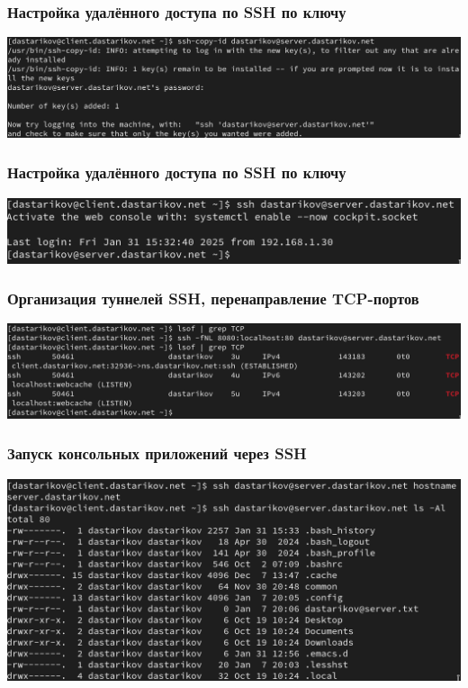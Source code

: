 \begin{frame}
\frametitle{Настройка удалённого доступа по SSH по ключу}
  \centering
  \includegraphics[width=\textwidth]{../images/image11.png}
\end{frame}

\begin{frame}
\frametitle{Настройка удалённого доступа по SSH по ключу}
  \centering
  \includegraphics[width=\textwidth]{../images/image12.png}
\end{frame}

\begin{frame}
\frametitle{Организация туннелей SSH, перенаправление TCP-портов}
  \centering
  \includegraphics[width=\textwidth]{../images/image13.png}
\end{frame}

\begin{frame}
\frametitle{Запуск консольных приложений через SSH}
  \centering
  \includegraphics[width=\textwidth]{../images/image14.png}
\end{frame}

